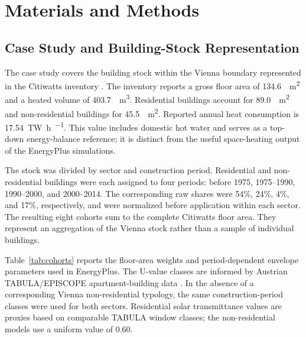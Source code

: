 \documentclass[10pt,twocolumn]{article}
\begin{document}
\section{Materials and Methods}

\subsection{Case Study and Building-Stock Representation}

The case study covers the building stock within the Vienna boundary represented
in the Citiwatts inventory \cite{citiwatts2026}. The inventory reports a gross
floor area of \SI{134.6}{\million\metre\squared} and a heated volume of
\SI{403.7}{\million\metre\cubed}. Residential buildings account for
\SI{89.0}{\million\metre\squared} and non-residential buildings for
\SI{45.5}{\million\metre\squared}. Reported annual heat consumption is
\SI{17.54}{\tera\watt\hour\per\annum}. This value includes domestic hot water
and serves as a top-down energy-balance reference; it is distinct from the
useful space-heating output of the EnergyPlus simulations.

The stock was divided by sector and construction period. Residential and
non-residential buildings were each assigned to four periods: before 1975,
1975--1990, 1990--2000, and 2000--2014. The corresponding raw shares were 54\%,
24\%, 4\%, and 17\%, respectively, and were normalized before application
within each sector. The resulting eight cohorts sum to the complete Citiwatts
floor area. They represent an aggregation of the Vienna stock rather than a
sample of individual buildings.

Table~\ref{tab:cohorts} reports the floor-area weights and
period-dependent envelope parameters used in EnergyPlus. The U-value classes
are informed by Austrian TABULA/EPISCOPE apartment-building data
\cite{loga2016,aea2012}. In the absence of a corresponding Vienna
non-residential typology, the same construction-period classes were used for
both sectors. Residential solar transmittance values are proxies based on
comparable TABULA window classes; the non-residential models use a uniform
value of 0.60.
\end{document}

